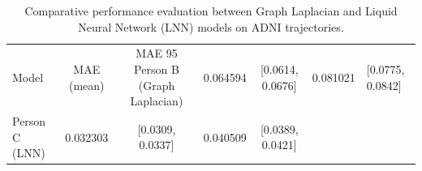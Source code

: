 \begin{table}[htbp]
\caption{Comparative performance evaluation between Graph Laplacian and Liquid Neural Network (LNN) models on ADNI trajectories.}
\label{tab:model_performance}
\begin{tabular}{lcccc}
\toprule
Model & MAE (mean) & MAE 95%
\midrule
Person B (Graph Laplacian) & 0.064594 & [0.0614, 0.0676] & 0.081021 & [0.0775, 0.0842] \\
Person C (LNN) & 0.032303 & [0.0309, 0.0337] & 0.040509 & [0.0389, 0.0421] \\
\bottomrule
\end{tabular}
\end{table}
